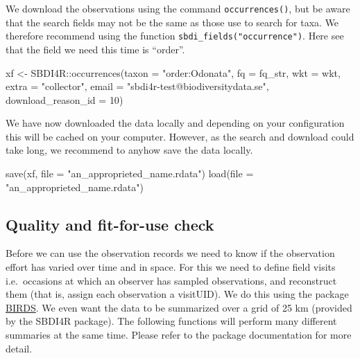 \documentclass[
  10pt,
]{article}
\newenvironment{Shaded}{\begin{snugshade}}{\end{snugshade}}
\newcommand{\AttributeTok}[1]{\textcolor[rgb]{0.77,0.63,0.00}{#1}}
\newcommand{\DecValTok}[1]{\textcolor[rgb]{0.00,0.00,0.81}{#1}}
\newcommand{\FunctionTok}[1]{\textcolor[rgb]{0.00,0.00,0.00}{#1}}
\newcommand{\NormalTok}[1]{#1}
\newcommand{\OtherTok}[1]{\textcolor[rgb]{0.56,0.35,0.01}{#1}}
\newcommand{\SpecialCharTok}[1]{\textcolor[rgb]{0.00,0.00,0.00}{#1}}
\newcommand{\StringTok}[1]{\textcolor[rgb]{0.31,0.60,0.02}{#1}}
\begin{document}
We download the observations using the command \texttt{occurrences()}, but be aware that
the search fields may not be the same as those use to search for taxa. We therefore
recommend using the function \texttt{sbdi\_fields("occurrence")}. Here see that the field
we need this time is ``order''.

\begin{Shaded}
\begin{Highlighting}[]
\NormalTok{xf }\OtherTok{\textless{}{-}}\NormalTok{ SBDI4R}\SpecialCharTok{::}\FunctionTok{occurrences}\NormalTok{(}\AttributeTok{taxon =} \StringTok{"order:Odonata"}\NormalTok{, }
                  \AttributeTok{fq =}\NormalTok{ fq\_str,}
                  \AttributeTok{wkt =}\NormalTok{ wkt,}
                  \AttributeTok{extra =} \StringTok{"collector"}\NormalTok{,}
                  \AttributeTok{email =} \StringTok{"sbdi4r{-}test@biodiversitydata.se"}\NormalTok{, }
                  \AttributeTok{download\_reason\_id =} \DecValTok{10}\NormalTok{)}
\end{Highlighting}
\end{Shaded}

We have now downloaded the data locally and depending on your configuration this
will be cached on your computer. However, as the search and download could take
long, we recommend to anyhow save the data locally.

\begin{Shaded}
\begin{Highlighting}[]
\FunctionTok{save}\NormalTok{(xf, }\AttributeTok{file =} \StringTok{"an\_approprieted\_name.rdata"}\NormalTok{)}
\FunctionTok{load}\NormalTok{(}\AttributeTok{file =} \StringTok{"an\_approprieted\_name.rdata"}\NormalTok{)}
\end{Highlighting}
\end{Shaded}

\hypertarget{quality-and-fit-for-use-check}{%
\subsection{Quality and fit-for-use check}\label{quality-and-fit-for-use-check}}

Before we can use the observation records we need to know if the observation
effort has varied over time and in space. For this we need to define field visits
i.e.~occasions at which an observer has sampled observations, and reconstruct them
(that is, assign each observation a visitUID). We do this using the package
\href{https://greensway.github.io/BIRDS/}{BIRDS}. We even want the data to be summarized
over a grid of 25 km (provided by the SBDI4R package). The following functions
will perform many different summaries at the same time. Please refer to the package
documentation for more detail.
\end{document}
